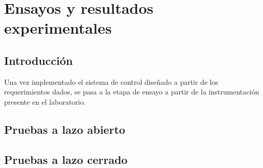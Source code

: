 \chapter{Ensayos y resultados experimentales}

\section{Introducción}

Una vez implementado el sistema de control diseñado a partir de los requerimientos dados, se pasa a la etapa de ensayo a partir de la instrumentación presente en el laboratorio.

\section{Pruebas a lazo abierto}

\section{Pruebas a lazo cerrado}



\newpage